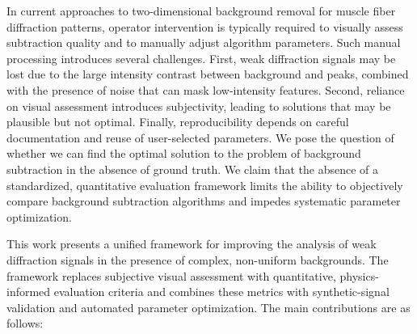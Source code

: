 \documentclass[iucr]{iucrjournals}
\begin{document}



In current approaches to two-dimensional background removal for muscle fiber diffraction patterns, operator intervention is typically required to visually assess subtraction quality and to manually adjust algorithm parameters. Such manual processing introduces several challenges. First, weak diffraction signals may be lost due to the large intensity contrast between background and peaks, combined with the presence of noise that can mask low-intensity features. Second, reliance on visual assessment introduces subjectivity, leading to solutions that may be plausible but not optimal. Finally, reproducibility depends on careful documentation and reuse of user-selected parameters. We pose the question of whether we can find the optimal solution to the problem of background subtraction in the absence of ground truth. We claim that the absence of a standardized, quantitative evaluation framework limits the ability to objectively compare background subtraction algorithms and impedes systematic parameter optimization.


This work presents a unified framework for improving the analysis of weak diffraction signals in the presence of complex, non-uniform backgrounds. The framework replaces subjective visual assessment with quantitative, physics-informed evaluation criteria and combines these metrics with synthetic-signal validation and automated parameter optimization. The main contributions are as follows:
\end{document}
